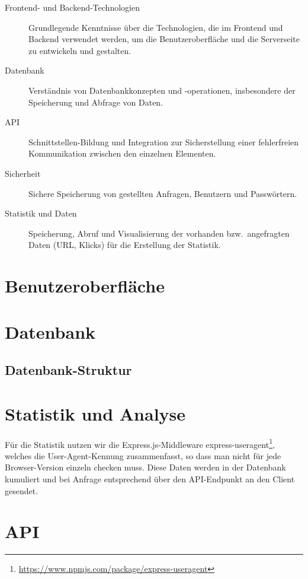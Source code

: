 \documentclass[a4paper,11pt,DIV=12,overfullrule=on]{scrreprt}
\begin{document}
\begin{description}
    \item[Frontend- und Backend-Technologien] Grundlegende Kenntnisse über die Technologien, die im Frontend und Backend verwendet werden, um die Benutzeroberfläche und die Serverseite zu entwickeln und gestalten.

    \item[Datenbank] Verständnis von Datenbankkonzepten und -operationen, insbesondere der Speicherung und Abfrage von Daten.

    \item[API] Schnittstellen-Bildung und Integration zur Sicherstellung einer fehlerfreien Kommunikation zwischen den einzelnen Elementen.

    \item[Sicherheit] Sichere Speicherung von gestellten Anfragen, Benutzern und Passwörtern.

    \item[Statistik und Daten] Speicherung, Abruf und Visualisierung der vorhanden bzw.\ angefragten Daten (URL, Klicks) für die Erstellung der Statistik.
\end{description}

\section{Benutzeroberfläche}
\section{Datenbank}
\subsection{Datenbank-Struktur}
\section{Statistik und Analyse}
Für die Statistik nutzen wir die Express.js-Middleware {\ttfamily express-useragent}\footnote{\href{https://www.npmjs.com/package/express-useragent}{https://www.npmjs.com/package/express-useragent}}, welches die User-Agent-Kennung zusammenfasst, so dass man nicht für jede Browser-Version einzeln checken muss. Diese Daten werden in der Datenbank kumuliert und bei Anfrage entsprechend über den API-Endpunkt an den Client gesendet.

\section{API}
\end{document}
